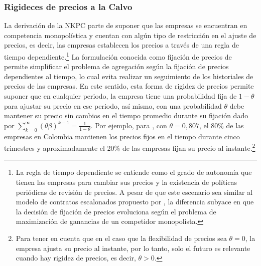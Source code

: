 \subsubsection*{Rigideces de precios a la Calvo}\label{secrig}
La derivación de la NKPC parte de suponer que las empresas se encuentran en competencia monopolística y cuentan con algún tipo de restricción en el ajuste de precios, es decir, las empresas establecen los precios a través de una regla de tiempo dependiente.\footnote{ La regla de tiempo dependiente se entiende como el grado de autonomía que tienen las empresas para cambiar sus precios y la existencia de políticas periódicas de revisión de precios. A pesar de que este escenario sea similar al modelo de contratos escalonados propuesto por \cite{taylor1980aggregate}, la diferencia subyace en que la decisión de fijación de precios evoluciona según el  problema de maximización de ganancias de un competidor monopolista.}  La formulación conocida como fijación de precios de \cite{calvo1983staggered} permite simplificar el problema de agregación según la fijación de precios dependientes al tiempo, lo cual evita realizar un seguimiento de los historiales de precios de las empresas. En este sentido, esta forma de rigidez de precios permite suponer que en cualquier periodo, la empresa tiene una probabilidad fija de $1-\theta$ para ajustar su precio en ese periodo, así mismo, con una probabilidad $\theta$ debe mantener su precio sin cambios en el tiempo promedio durante su fijación dado por $\sum_{k=0}^{\infty} (\theta\beta)^{k-1}=\frac{1}{1-\theta}$. Por ejemplo, para \cite{galvis2010estimacion}, con $\theta=0,807$, el 80\% de las empresas en Colombia mantienen los precios fijos en el tiempo durante cinco trimestres y aproximadamente el 20\% de las empresas fijan su precio al instante.\footnote{Para tener en cuenta que en el caso que la flexibilidad de precios sea $\theta=0$, la empresa ajusta su precio al instante, por lo tanto, solo el futuro es relevante cuando hay rigidez de precios, es decir, $\theta>0$. }  \\ 

